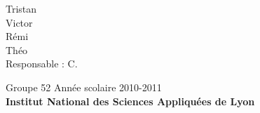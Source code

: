 \documentclass[10pt,twoside,a4paper,titlepage]{article}
\begin{document}
\begin{center}
\vspace*{1cm}
\LARGE \color{black} Tristan  \\
					 Victor  \\
					 Rémi  \\
					 Th\'eo  \\
\vspace*{1.5cm}
\Large Responsable : C. \\

\vspace*{1cm}

\Large Groupe 52 \hfill Ann\'ee scolaire 2010-2011\\
\vspace*{1cm}
\textbf{\Large Institut National des Sciences Appliqu\'{e}es de Lyon} \pagebreak
\end{center}


 


\end{document}
